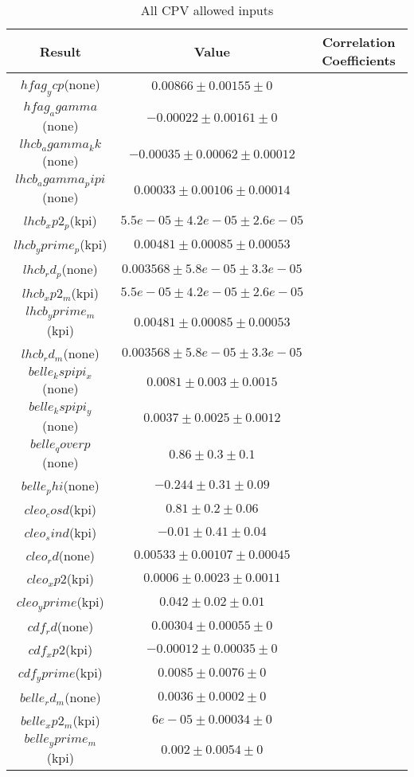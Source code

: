 \begin{table}[htdp]
\caption{All CPV allowed inputs}
\begin{center}
\begin{tabular}{|c|c|c|}
\hline
Result & Value & Correlation Coefficients \\
\hline \hline
$hfag_ycp$(none) & $0.00866\pm0.00155\pm0$ & \\
$hfag_agamma$(none) & $-0.00022\pm0.00161\pm0$ & \\
$lhcb_agamma_kk$(none) & $-0.00035\pm0.00062\pm0.00012$ & \\
$lhcb_agamma_pipi$(none) & $0.00033\pm0.00106\pm0.00014$ & \\
$lhcb_xp2_p$(kpi) & $5.5e-05\pm4.2e-05\pm2.6e-05$ & \\
$lhcb_yprime_p$(kpi) & $0.00481\pm0.00085\pm0.00053$ & \\
$lhcb_rd_p$(none) & $0.003568\pm5.8e-05\pm3.3e-05$ & \\
$lhcb_xp2_m$(kpi) & $5.5e-05\pm4.2e-05\pm2.6e-05$ & \\
$lhcb_yprime_m$(kpi) & $0.00481\pm0.00085\pm0.00053$ & \\
$lhcb_rd_m$(none) & $0.003568\pm5.8e-05\pm3.3e-05$ & \\
$belle_kspipi_x$(none) & $0.0081\pm0.003\pm0.0015$ & \\
$belle_kspipi_y$(none) & $0.0037\pm0.0025\pm0.0012$ & \\
$belle_qoverp$(none) & $0.86\pm0.3\pm0.1$ & \\
$belle_phi$(none) & $-0.244\pm0.31\pm0.09$ & \\
$cleo_cosd$(kpi) & $0.81\pm0.2\pm0.06$ & \\
$cleo_sind$(kpi) & $-0.01\pm0.41\pm0.04$ & \\
$cleo_rd$(none) & $0.00533\pm0.00107\pm0.00045$ & \\
$cleo_xp2$(kpi) & $0.0006\pm0.0023\pm0.0011$ & \\
$cleo_yprime$(kpi) & $0.042\pm0.02\pm0.01$ & \\
$cdf_rd$(none) & $0.00304\pm0.00055\pm0$ & \\
$cdf_xp2$(kpi) & $-0.00012\pm0.00035\pm0$ & \\
$cdf_yprime$(kpi) & $0.0085\pm0.0076\pm0$ & \\
$belle_rd_m$(none) & $0.0036\pm0.0002\pm0$ & \\
$belle_xp2_m$(kpi) & $6e-05\pm0.00034\pm0$ & \\
$belle_yprime_m$(kpi) & $0.002\pm0.0054\pm0$ & \\

\end{tabular}
\end{center}
\end{table}
